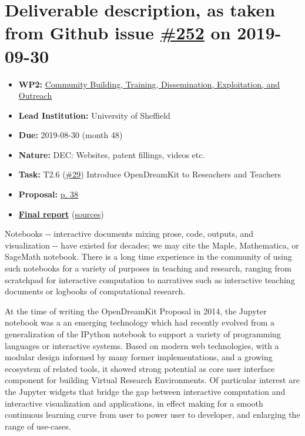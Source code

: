 \hypertarget{deliverable-description-as-taken-from-github-issue-252-on-2019-09-30}{%
\section*{\texorpdfstring{Deliverable description, as taken from Github
issue
\href{https://github.com/OpenDreamKit/OpenDreamKit/issues/252}{\#252} on
2019-09-30}{Deliverable description, as taken from Github issue \#252 on 2019-09-30}}\label{deliverable-description-as-taken-from-github-issue-252-on-2019-09-30}}

\begin{itemize}
\tightlist
\item
  \textbf{WP2:}
  \href{https://github.com/OpenDreamKit/OpenDreamKit/tree/master/WP2}{Community
  Building, Training, Dissemination, Exploitation, and Outreach}
\item
  \textbf{Lead Institution:} University of Sheffield
\item
  \textbf{Due:} 2019-08-30 (month 48)
\item
  \textbf{Nature:} DEC: Websites, patent fillings, videos etc.
\item
  \textbf{Task:} T2.6
  (\href{https://github.com/OpenDreamKit/OpenDreamKit/issues/29}{\#29})
  Introduce OpenDreamKit to Reseachers and Teachers
\item
  \textbf{Proposal:}
  \href{https://github.com/OpenDreamKit/OpenDreamKit/raw/master/Proposal/proposal-www.pdf}{p.
  38}
\item
  \textbf{\href{https://github.com/OpenDreamKit/OpenDreamKit/raw/master/WP2/D2.17/report-final.pdf}{Final
  report}}
  (\href{https://github.com/OpenDreamKit/OpenDreamKit/raw/master/WP2/D2.17/}{sources})
\end{itemize}

Notebooks -\/- interactive documents mixing prose, code, outputs, and
visualization -\/- have existed for decades; we may cite the Maple,
Mathematica, or SageMath notebook. There is a long time experience in
the community of using such notebooks for a variety of purposes in
teaching and research, ranging from scratchpad for interactive
computation to narratives such as interactive teaching documents or
logbooks of computational research.

At the time of writing the OpenDreamKit Proposal in 2014, the Jupyter
notebook was a an emerging technology which had recently evolved from a
generalization of the IPython notebook to support a variety of
programming languages or interactive systems. Based on modern web
technologies, with a modular design informed by many former
implementations, and a growing ecosystem of related tools, it showed
strong potential as core user interface component for building Virtual
Research Environments. Of particular interest are the Jupyter widgets
that bridge the gap between interactive computation and interactive
visualization and applications, in effect making for a smooth continuous
learning curve from user to power user to developer, and enlarging the
range of use-cases.

